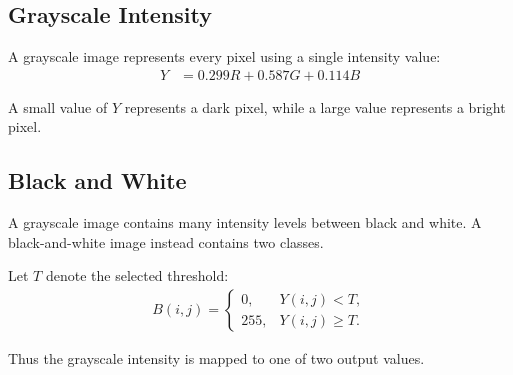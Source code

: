 \subsection{Grayscale Intensity}

A grayscale image represents every pixel using a single intensity
value:
\begin{align}
Y&=0.299R+0.587G+0.114B\label{eq:grayscale_y}
\end{align}

A small value of $Y$ represents a dark pixel, while a large value
represents a bright pixel.
\vspace*{\baselineskip}
\subsection{Black and White}

A grayscale image contains many intensity levels between black and
white. A black-and-white image instead contains two classes.

Let $T$ denote the selected threshold:
\begin{align}
B(i,j)=
\begin{cases}
0, & Y(i,j)<T,\\
255, & Y(i,j)\geq T.
\end{cases}\label{eq:bw_threshold}
\end{align}

Thus the grayscale intensity is mapped to one of two output values.
